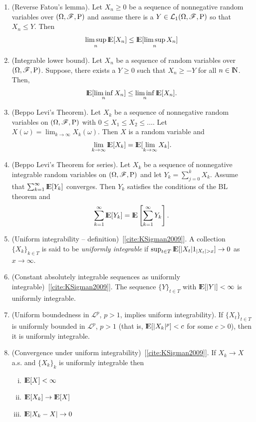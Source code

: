 \documentclass[a4paper,10pt]{article}
\begin{document}
\begin{enumerate}
 \item 	(Reverse Fatou's lemma). Let $X_n\geq 0$ be a sequence of nonnegative random variables over $(\Omega,\mathscr{F},\mathrm{P})$ and
	assume there is a $Y\in\mathcal{L}_1(\Omega,\mathscr{F},\mathrm{P})$ so that $X_n\leq Y$. Then
	\[ 
	 \limsup_n \E[X_n] \leq \E[\limsup_n X_n]
	\]
 \item (Integrable lower bound). 	
	Let $X_n$ be a sequence of random variables over $(\Omega,\mathscr{F},\mathrm{P})$. Suppose, there exists a
	$Y\geq 0$ such that $X_n\geq -Y$ for all $n\in\N$. Then,
	\[
	\E[\liminf_n X_n] \leq  \liminf_n \E[X_n].
	\]
 \item (Beppo Levi's Theorem).
	Let $X_k$ be a sequence of nonnegative random variables on $(\Omega,\mathscr{F},\mathrm{P})$ with $0 \leq X_1 \leq X_{2} \leq \ldots$. 
	Let $X(\omega) = \lim_{k\to\infty}X_k(\omega)$. Then $X$ is a random variable and 
	\[
	 \lim_{k\to\infty} \E[X_k] = \E[\lim_{k\to\infty} X_k].
	\]
 \item (Beppo Levi's Theorem for series).
       Let $X_k$ be a sequence of nonnegative integrable random variables on $(\Omega,\mathscr{F},\mathrm{P})$
       and let $Y_k = \sum_{j=0}^k X_k$. Assume that $\sum_{k=1}^{\infty} \E[Y_k]$ converges.
       Then $Y_k$ satisfies the conditions of the BL theorem and
       \[
        \sum_{k=1}^{\infty} \E[Y_k] = \E \left[\sum_{k=1}^{\infty}Y_k\right].
       \]

 \item (Uniform integrability -- definition)~[\ref{cite:KSigman2009}]. A collection $\{X_k\}_{k\in T}$ is said to be \textit{uniformly
        integrable} if $\sup_{t\in T}\E[|X_t| 1_{|X_t|>x}] \to 0$ as $x\to\infty$.
        
 \item (Constant absolutely integrable sequences as uniformly integrable)~[\ref{cite:KSigman2009}]. The sequence $\{Y\}_{t\in T}$
       with $\E[|Y|]<\infty$ is uniformly integrable.

 \item (Uniform boundedness in $\mathcal{L}^p$, $p>1$, implies uniform integrability).
       If $\{X_t\}_{t\in T}$ is uniformly bounded in $\mathcal{L}^p$, $p>1$ (that is, 
       $\E[|X_k|^p] < c$ for some $c>0$), then it is uniformly integrable.
       
 \item (Convergence under uniform integrability)~[\ref{cite:KSigman2009}]. If $X_k \to X$ a.s. and $\{X_k\}_k$ is uniformly 
       integrable then
       \begin{enumerate}[i.]
         \item $\E[X]< \infty$
         \item $\E[X_k] \to \E[X]$        
        \item $\E|X_k-X|\to 0$
       \end{enumerate}

\end{enumerate}
\end{document}
